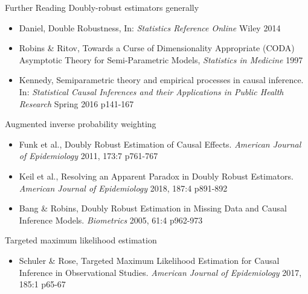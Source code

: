 \documentclass{beamer}
\begin{document}
\begin{frame}{Further Reading}
	\scriptsize
	Doubly-robust estimators generally
	\begin{itemize}
		\item Daniel, Double Robustness, In: \textit{Statistics Reference Online} Wiley 2014
		\item Robins \& Ritov, Towards a Curse of Dimensionality Appropriate (CODA) Asymptotic Theory for Semi-Parametric Models, \textit{Statistics in Medicine} 1997
		\item Kennedy, Semiparametric theory and empirical processes in causal inference. In: \textit{Statistical Causal Inferences and their Applications in Public Health Research} Spring 2016 p141-167
	\end{itemize}
	Augmented inverse probability weighting
	\begin{itemize}
		\item Funk et al., Doubly Robust Estimation of Causal Effects. \textit{American Journal of Epidemiology} 2011, 173:7 p761-767
		\item Keil et al., Resolving an Apparent Paradox in Doubly Robust Estimators. \textit{American Journal of Epidemiology} 2018, 187:4 p891-892
		\item Bang \& Robins, Doubly Robust Estimation in Missing Data and Causal Inference Models. \textit{Biometrics} 2005, 61:4 p962-973
	\end{itemize}	
	Targeted maximum likelihood estimation
	\begin{itemize}
		\item Schuler \& Rose, Targeted Maximum Likelihood Estimation for Causal Inference in Observational Studies. \textit{American Journal of Epidemiology} 2017, 185:1 p65-67
	\end{itemize}		
\end{frame}
\end{document}
